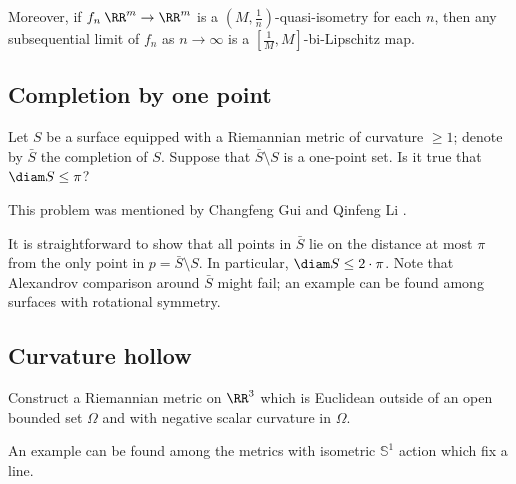 
Moreover,
if $f_n\:\RR^m\to\RR^m$ is a $(M,\frac1n)$-quasi-isometry
for each $n$,
then any subsequential limit of $f_n$ as $n\to\infty$
is a $[\tfrac1M,M]$-bi-Lipschitz map.












\subsection*{Completion by one point}

\begin{pr}
Let $S$ be a surface equipped with a Riemannian metric of curvature $\ge 1$;
denote by $\bar S$ the completion of $S$.
Suppose that $\bar S\setminus S$ is a one-point set.
Is it true that $\diam S\le \pi$?
\end{pr}

This problem was mentioned by Changfeng Gui and Qinfeng Li
\cite[right after Theorem 1.4]{gui-li}.

It is straightforward to show that all points in $\bar S$ lie on the distance at most $\pi$ from the only point in $p=\bar S\setminus S$.
In particular, $\diam S\le 2\cdot\pi$.
Note that Alexandrov comparison around $\bar S$ might fail;
an example can be found among surfaces with rotational symmetry.






















\subsection*{Curvature hollow}
\label{Curvature hollow}

\begin{pr}
Construct a Riemannian metric on $\RR^3$ 
which is Euclidean outside of an open bounded set $\Omega$ 
and with negative scalar curvature in $\Omega$.
\end{pr}

An example can be found among the  metrics with isometric $\mathbb{S}^1$ action which fix a line.

